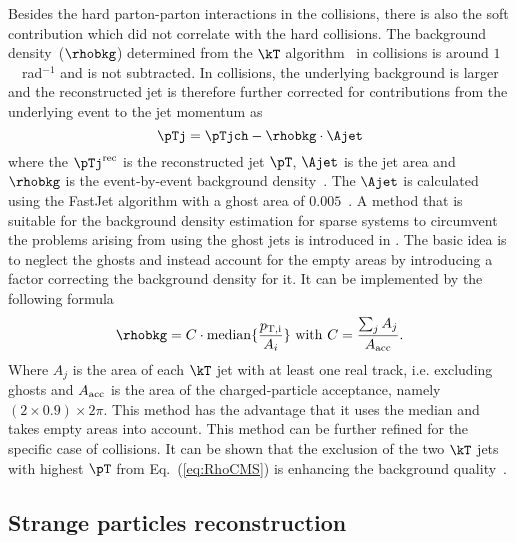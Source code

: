 \documentclass[ALICE,manyauthors]{cernphprep}
\begin{document}
Besides the hard parton-parton interactions in the collisions, there is also the soft contribution which did not correlate with the hard collisions.
The background density~($\rhobkg$) determined from the $\kT$ algorithm~\cite{Catani:1993hr, Ellis:1993tq} in \pp collisions is around $1$~\GeVc~rad$^{-1}$ and is not subtracted.
In \pPb collisions, the underlying background is larger and the reconstructed jet is therefore further corrected for contributions from the underlying event to the jet momentum as
\begin{equation}
\pTj = \pTjch - \rhobkg\cdot\Ajet
\label{eq:DeltaPt}
\end{equation}
where the $\pTj^{\rm rec}$ is the reconstructed jet $\pT$, $\Ajet$ is the jet area and $\rhobkg$ is the event-by-event background density~\cite{Cacciari:2007fd}.
The $\Ajet$ is calculated using the FastJet algorithm with a ghost area of $0.005$~\cite{Cacciari:2008gn}.
A method that is suitable for the background density estimation for sparse systems to circumvent the problems arising from using the ghost jets is introduced in \cite{Chatrchyan:2012tt}.
The basic idea is to neglect the ghosts and instead account for the empty areas by introducing a factor correcting the background density for it.
It can be implemented by the following formula
\begin{equation}
\rhobkg = C\cdot{\rm median}\{\frac{p_{\rm T,i}}{A_{i}}\} ~ {\rm with}~ C = \frac{\sum_{j}A_{j}}{A_{\rm acc}}.
\label{eq:RhoCMS}
\end{equation}
Where $A_{j}$ is the area of each $\kT$ jet with at least one real track, i.e. excluding ghosts and $A_{\rm acc}$ is the area of the charged-particle acceptance, namely $(2 \times 0.9) \times 2\pi$.
This method has the advantage that it uses the median and takes empty areas into account.
This method can be further refined for the specific case of \pPb collisions.
It can be shown that the exclusion of the two $\kT$ jets with highest $\pT$ from Eq.~(\ref{eq:RhoCMS}) is enhancing the background quality~\cite{ALICE:2015umm, ALICE:2016faw}.

\subsection{Strange particles reconstruction}%
\label{sec:ParRec}
\end{document}
